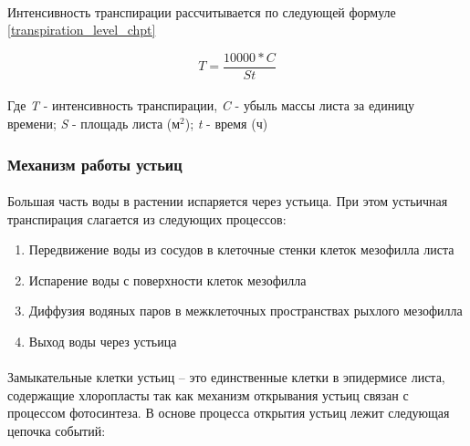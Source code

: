\paragraph*{}Интенсивность транспирации рассчитывается  по следующей формуле \ref{transpiration_level_chpt} 

\begin{equation}
	\label{transpiration_level_chpt}
	T = \frac{10000*C}{St}
\end{equation}

\paragraph*{}Где \textit{T} - интенсивность транспирации, \textit{C} - убыль массы листа за единицу времени; \textit{S} - площадь листа (м$^2$); \textit{t} - время (ч)


\subsubsection*{Механизм работы устьиц}

\paragraph*{}Большая часть воды в растении испаряется через устьица. При этом устьичная транспирация слагается из следующих процессов:

\begin{enumerate}
	\item Передвижение воды из сосудов в клеточные стенки клеток мезофилла листа
	\item Испарение воды с поверхности клеток мезофилла
	\item Диффузия водяных паров в межклеточных пространствах рыхлого мезофилла
	\item Выход воды через устьица
\end{enumerate}

\paragraph*{}Замыкательные клетки устьиц -- это единственные клетки в эпидермисе листа, содержащие хлоропласты так как механизм открывания устьиц связан с процессом фотосинтеза. В основе процесса открытия устьиц лежит следующая цепочка событий:

